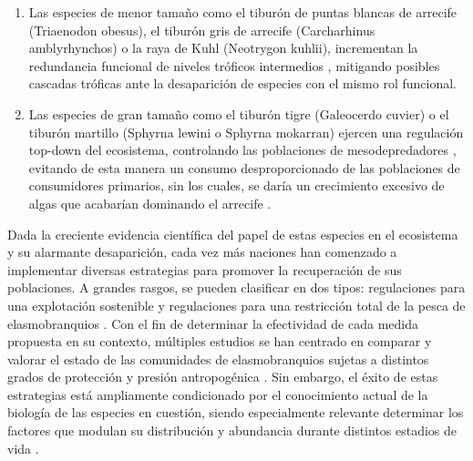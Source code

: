 \documentclass[a4paper, 11pt]{article}
\begin{document}
\begin{enumerate}
\item Las especies de menor tamaño como el tiburón de puntas blancas de arrecife (Triaenodon obesus), el tiburón gris de arrecife (Carcharhinus amblyrhynchos) o la raya de Kuhl (Neotrygon kuhlii), incrementan la redundancia funcional de niveles tróficos intermedios \cite{Jacobsen2013, Frisch2016}, mitigando posibles cascadas tróficas ante la desaparición de especies con el mismo rol funcional. 
\item Las especies de gran tamaño como el tiburón tigre (Galeocerdo cuvier) o el tiburón martillo (Sphyrna lewini o Sphyrna mokarran) ejercen una regulación top-down del ecosistema, controlando las poblaciones de mesodepredadores \cite{Ruppert2013}, evitando de esta manera un consumo desproporcionado de las poblaciones de consumidores primarios, sin los cuales, se daría un crecimiento excesivo de algas que acabarían dominando el arrecife \cite{Bellwood2004}.
\end{enumerate}
Dada la creciente evidencia científica del papel de estas especies en el ecosistema y su alarmante desaparición, cada vez más naciones han comenzado a implementar diversas estrategias para promover la recuperación de sus poblaciones. A grandes rasgos, se pueden clasificar en dos tipos: regulaciones para una explotación sostenible y regulaciones para una restricción total de la pesca de elasmobranquios \cite{Shiffman2016}. Con el fin de determinar la efectividad de cada medida propuesta en su contexto, múltiples estudios se han centrado en comparar y valorar el estado de las comunidades de elasmobranquios sujetas a distintos grados de protección y presión antropogénica \cite{Juhel2018, Speed2018}. Sin embargo, el éxito de estas estrategias está ampliamente condicionado por el conocimiento actual de la biología de las especies en cuestión, siendo especialmente relevante determinar los factores que modulan su distribución y abundancia durante distintos estadios de vida \cite{Schlaff2014}.
\end{document}
